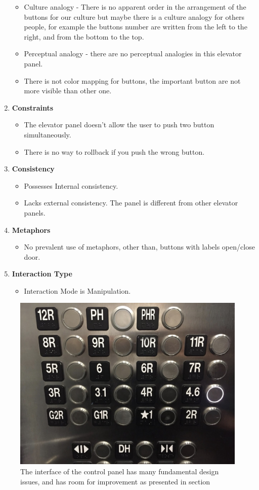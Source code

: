 \documentclass[10pt]{scrartcl}
\begin{document}
\begin{enumerate}
\begin{itemize}
					\item Culture analogy - There is no apparent order in the arrangement of the buttons for our culture but maybe there is a culture analogy for others people, for example the buttons number are written from the left to the right, and from the bottom to the top.
					
					\item Perceptual analogy - there are no perceptual analogies in this elevator panel.
					\item There is not color mapping for buttons, the important button are not more visible than other one.
				\end{itemize}
				
					\item \textbf{Constraints} 
						\begin{itemize}
						\item The elevator panel doesn't allow the user to push two button simultaneously.
						\item There is no way to rollback if you push the wrong button.
					\end{itemize}
					
						\item \textbf{Consistency} 
							\begin{itemize}
							\item Possesses Internal consistency.
							\item Lacks external consistency. The panel is different from other elevator panels. 
						\end{itemize}
						
							\item \textbf{Metaphors} 	
								\begin{itemize}
								\item No prevalent use of metaphors, other than, buttons with
                                 labels open/close door.

							\end{itemize}
							
							\item \textbf{Interaction Type}
								\begin{itemize}
								\item Interaction Mode is Manipulation.
						
							\end{itemize}
			
	\end{enumerate}
\begin{figure}
	\centering
	\includegraphics[width=0.3\linewidth]{controlpanel}
	\caption{The interface of the control panel has many fundamental design issues, and has room for improvement as presented in section}
	\label{fig:controlpanel}
\end{figure}
\end{document}
